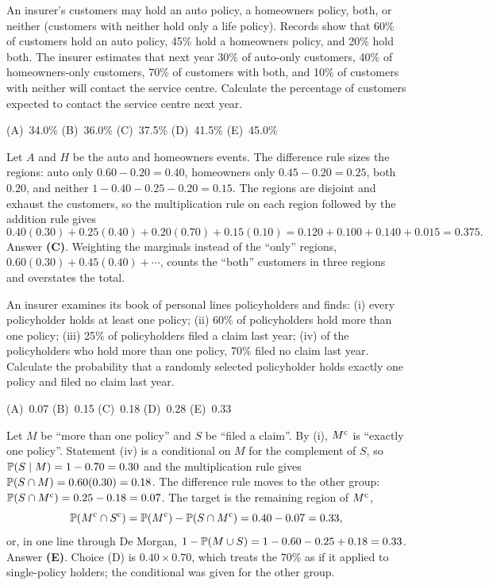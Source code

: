\begin{example}
An insurer's customers may hold an auto policy, a homeowners policy, both, or neither (customers
with neither hold only a life policy). Records show that 60\% of customers hold an auto policy,
45\% hold a homeowners policy, and 20\% hold both. The insurer estimates that next year 30\% of
auto-only customers, 40\% of homeowners-only customers, 70\% of customers with both, and 10\% of
customers with neither will contact the service centre.
Calculate the percentage of customers expected to contact the service centre next year.
\par\smallskip\noindent (A)~34.0\% \qquad (B)~36.0\% \qquad (C)~37.5\% \qquad (D)~41.5\% \qquad (E)~45.0\%
\end{example}
\begin{solution}
Let $A$ and $H$ be the auto and homeowners events. The difference rule sizes the regions:
auto only $0.60 - 0.20 = 0.40$, homeowners only $0.45 - 0.20 = 0.25$, both $0.20$, and neither
$1 - 0.40 - 0.25 - 0.20 = 0.15$. The regions are disjoint and exhaust the customers, so the
multiplication rule on each region followed by the addition rule gives
\[
0.40(0.30) + 0.25(0.40) + 0.20(0.70) + 0.15(0.10) = 0.120 + 0.100 + 0.140 + 0.015 = 0.375.
\]
Answer \textbf{(C)}. Weighting the marginals instead of the ``only'' regions, $0.60(0.30) +
0.45(0.40) + \cdots$, counts the ``both'' customers in three regions and overstates the total.
\end{solution}

\begin{example}
An insurer examines its book of personal lines policyholders and finds:
(i) every policyholder holds at least one policy;
(ii) 60\% of policyholders hold more than one policy;
(iii) 25\% of policyholders filed a claim last year;
(iv) of the policyholders who hold more than one policy, 70\% filed no claim last year.
Calculate the probability that a randomly selected policyholder holds exactly one policy and filed
no claim last year.
\par\smallskip\noindent (A)~0.07 \qquad (B)~0.15 \qquad (C)~0.18 \qquad (D)~0.28 \qquad (E)~0.33
\end{example}
\begin{solution}
Let $M$ be ``more than one policy'' and $S$ be ``filed a claim''. By (i), $M^{\mathrm{c}}$ is ``exactly
one policy''. Statement (iv) is a conditional on $M$ for the complement of $S$, so
$\mathbb{P}(S \mid M) = 1 - 0.70 = 0.30$ and the multiplication rule gives
$\mathbb{P}(S \cap M) = 0.60(0.30) = 0.18$. The difference rule moves to the other group:
$\mathbb{P}(S \cap M^{\mathrm{c}}) = 0.25 - 0.18 = 0.07$. The target is the remaining region of $M^{\mathrm{c}}$,
\[
\mathbb{P}(M^{\mathrm{c}} \cap S^{\mathrm{c}}) = \mathbb{P}(M^{\mathrm{c}}) - \mathbb{P}(S \cap M^{\mathrm{c}}) = 0.40 - 0.07 = 0.33,
\]
or, in one line through De Morgan, $1 - \mathbb{P}(M \cup S) = 1 - 0.60 - 0.25 + 0.18 = 0.33$.
Answer \textbf{(E)}. Choice (D) is $0.40 \times 0.70$, which treats the 70\% as if it applied to
single-policy holders; the conditional was given for the other group.
\end{solution}

